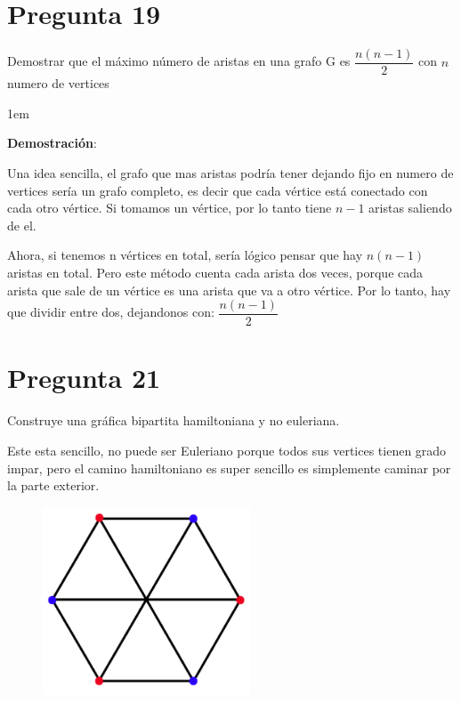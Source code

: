 \documentclass[12pt, fleqn]{article}                            %
\newenvironment{SmallIndentation}[1][0.75em]                    %
        {\begin{adjustwidth}{#1}{}\begin{footnotesize}}             %
        {\end{footnotesize}\end{adjustwidth}}                       %
\theoremstyle{break}                                            %
\begin{document}
    \clearpage
    \section{Pregunta 19}

        Demostrar que el máximo número de aristas en una grafo G es $\dfrac{n(n-1)}{2}$ con $n$ numero de vertices 

        \begin{SmallIndentation}[1em]
            \textbf{Demostración}:

                Una idea sencilla, el grafo que mas aristas podría tener dejando fijo en numero de vertices sería un grafo completo,
                es decir que cada vértice está conectado con cada otro vértice.
                Si tomamos un vértice, por lo tanto tiene $n-1$ aristas saliendo de el.

                Ahora, si tenemos n vértices en total, sería lógico pensar que hay $n (n- 1)$ aristas en total.
                Pero este método cuenta cada arista dos veces, porque cada arista que sale de un vértice es una arista que va a otro vértice.
                Por lo tanto, hay que dividir entre dos, dejandonos con: $\dfrac{n(n-1)}{2}$
        \end{SmallIndentation}


    \clearpage
    \section{Pregunta 21}

        Construye una gráfica bipartita hamiltoniana y no euleriana.

        Este esta sencillo, no puede ser Euleriano porque todos sus vertices tienen grado impar, pero el camino hamiltoniano es super sencillo
        es simplemente caminar por la parte exterior.

                
        \begin{figure}[h]
            \centering
            \includegraphics[width=0.55\textwidth]{Question21}
        \end{figure}
\end{document}
